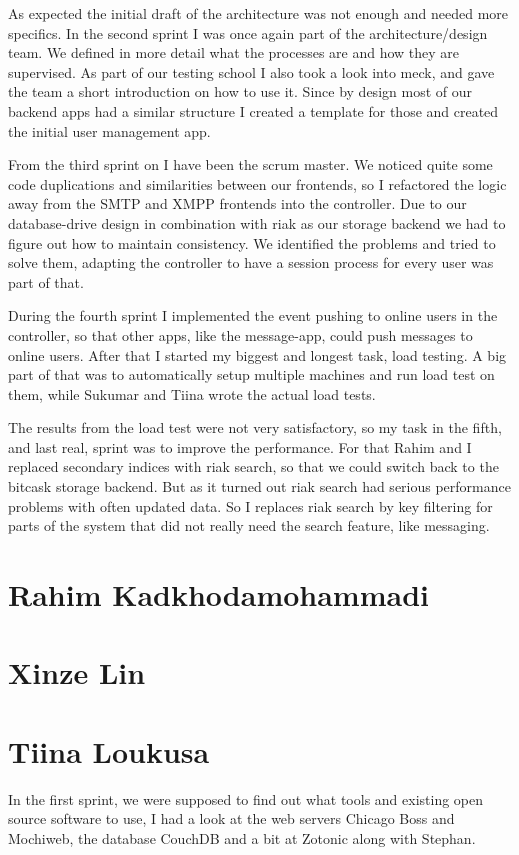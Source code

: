 \documentclass[11pt,a4paper]{report}
\begin{document}
As expected the initial draft of the architecture was not enough and needed more specifics.
In the second sprint I was once again part of the architecture/design team.
We defined in more detail what the processes are and how they are supervised.
As part of our testing school I also took a look into meck, and gave the team a short introduction
on how to use it.
Since by design most of our backend apps had a similar structure I created a template for those
and created the initial user management app.

From the third sprint on I have been the scrum master.
We noticed quite some code duplications and similarities between our frontends,
so I refactored the logic away from the SMTP and XMPP frontends into the controller.
Due to our database-drive design in combination with riak as our storage backend
we had to figure out how to maintain consistency.
We identified the problems and tried to solve them, adapting the controller to have a
session process for every user was part of that.

During the fourth sprint I implemented the event pushing to online users in the controller,
so that other apps, like the message-app, could push messages to online users.
After that I started my biggest and longest task, load testing.
A big part of that was to automatically setup multiple machines and run load test on them,
while Sukumar and Tiina wrote the actual load tests.

The results from the load test were not very satisfactory, so my task in the fifth, and last real,
sprint was to improve the performance.
For that Rahim and I replaced secondary indices with riak search, so that we could switch back to the bitcask storage backend.
But as it turned out riak search had serious performance problems with often updated data.
So I replaces riak search by key filtering for parts of the system that did not really need the search feature,
like messaging.

\section{Rahim Kadkhodamohammadi}
\section{Xinze Lin}
\section{Tiina Loukusa}
In the first sprint, we were supposed to find out what tools and existing
open source software to use, I had a look at the web servers Chicago Boss and
Mochiweb, the database CouchDB and a bit at Zotonic along with Stephan.
\end{document}
